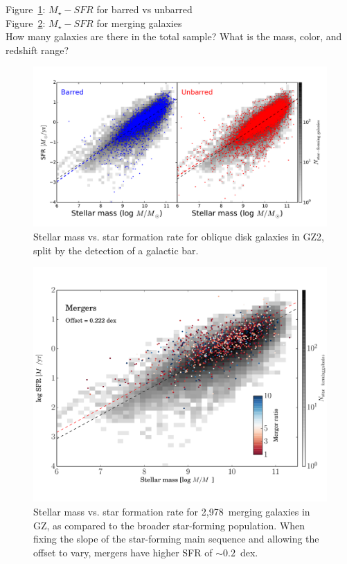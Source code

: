 \documentclass{emulateapj}
\begin{document}
Figure~\ref{fig-bar}: $M_\star-SFR$ for barred vs unbarred \\
Figure~\ref{fig-mergers}: $M_\star-SFR$ for merging galaxies \citet{dar10a} \\

How many galaxies are there in the total sample? What is the mass, color, and redshift range?

\begin{figure}
\includegraphics[angle=0,width=7.0in]{figures/ms_bar.pdf}
\caption{Stellar mass vs. star formation rate for oblique disk galaxies in GZ2, split by the detection of a galactic bar. 
\label{fig-bar}}
\end{figure}

\begin{figure}
\includegraphics[angle=0,width=7.0in]{figures/ms_mergers.pdf}
\caption{Stellar mass vs. star formation rate for 2,978~merging galaxies in GZ, as compared to the broader star-forming population. When fixing the slope of the star-forming main sequence and allowing the offset to vary, mergers have higher SFR of $\sim0.2$~dex.
\label{fig-mergers}}
\end{figure}
\end{document}
